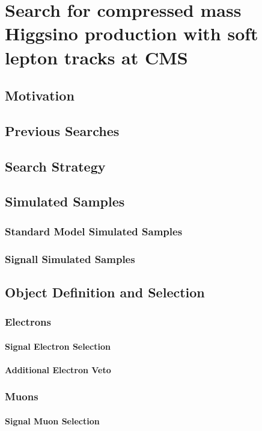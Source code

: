 \chapter{Search for compressed mass Higgsino production with soft
lepton tracks at CMS }

\section{Motivation}

\section{Previous Searches}

\section{Search Strategy}

\section{Simulated Samples}
\subsection{Standard Model Simulated Samples}
\subsection{Signall Simulated Samples}


\section{Object Definition and Selection}
\subsection{Electrons}
\subsubsection{Signal Electron Selection}
\subsubsection{Additional Electron Veto}
\subsection{Muons}
\subsubsection{Signal Muon Selection}
